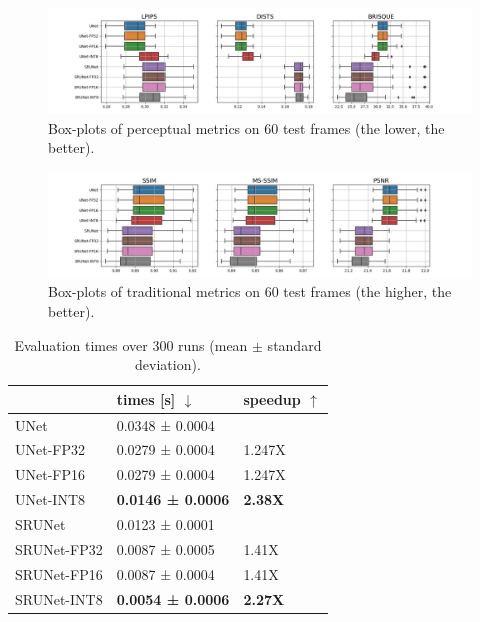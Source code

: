 \begin{figure}[ht]
\includegraphics[width=1.0\textwidth]{static/boxplots_perceptual_metrics.jpg}
\caption{Box-plots of perceptual metrics on 60 test frames (the lower, the better).}
\label{fig:perceptual-metrics}
\end{figure}

\begin{figure}[ht]
\includegraphics[width=1.0\textwidth]{static/boxplots_traditional_metrics.jpg}
\caption{Box-plots of traditional metrics on 60 test frames (the higher, the better).}
\label{fig:traditional-metrics}
\end{figure}

\begin{table}[t]
\begin{tabular}{lll}
\toprule
{} &      times [s] $\downarrow$ & speedup $\uparrow$ \\
\midrule
UNet        &  0.0348 ± 0.0004 & {} \\
UNet-FP32   &  0.0279 ± 0.0004 & 1.247X \\
UNet-FP16   &  0.0279 ± 0.0004 & 1.247X \\
UNet-INT8   &  \textbf{0.0146 ± 0.0006} & \textbf{2.38X} \\
\midrule
SRUNet      &  0.0123 ± 0.0001 & {} \\
SRUNet-FP32 &  0.0087 ± 0.0005 & 1.41X \\
SRUNet-FP16 &  0.0087 ± 0.0004 & 1.41X \\
SRUNet-INT8 &  \textbf{0.0054 ± 0.0006} & \textbf{2.27X} \\
\bottomrule
\end{tabular}
\caption{Evaluation times over 300 runs (mean $\pm$ standard deviation).}
\label{tab:timings}
\end{table}

